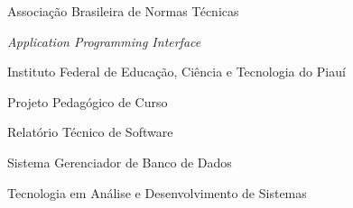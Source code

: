 \begin{siglas}
  \item[ABNT] Associação Brasileira de Normas Técnicas
  \item[API] \textit{Application Programming Interface}
  \item[IFPI] Instituto Federal de Educação, Ciência e Tecnologia do Piauí
  \item[PPC] Projeto Pedagógico de Curso
  \item[RTS] Relatório Técnico de Software
  \item[SGBD] Sistema Gerenciador de Banco de Dados
  \item[TADS] Tecnologia em Análise e Desenvolvimento de Sistemas
\end{siglas}
